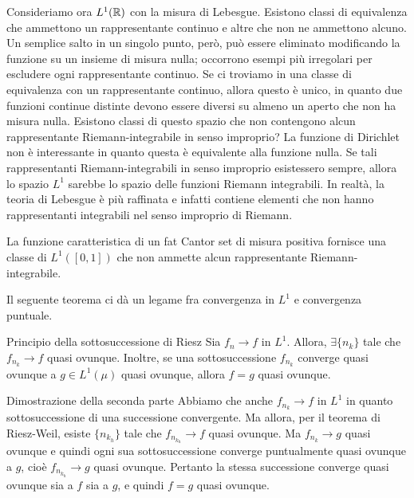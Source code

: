 \documentclass[a4paper]{article}
\begin{document}
\begin{radioactive}
Consideriamo ora \(L^1(\mathbb{R})\) con la misura di Lebesgue.
Esistono classi di equivalenza che ammettono un rappresentante continuo e altre che non ne ammettono alcuno. Un semplice salto in un singolo punto, però, può essere eliminato modificando la funzione su un insieme di misura nulla; occorrono esempi più irregolari per escludere ogni rappresentante continuo.
Se ci troviamo in una classe di equivalenza
con un rappresentante continuo, allora questo è unico, in quanto
due funzioni continue distinte devono essere diversi su almeno un aperto che non ha misura nulla.
Esistono classi di questo spazio che non contengono alcun rappresentante
Riemann-integrabile in senso improprio?
La funzione di Dirichlet non è interessante in quanto
questa è equivalente alla funzione nulla. Se tali rappresentanti Riemann-integrabili
in senso improprio esistessero sempre, allora lo spazio \(L^1\)
sarebbe lo spazio delle funzioni Riemann integrabili.
In realtà, la teoria di Lebesgue è più raffinata e infatti contiene
elementi che non hanno rappresentanti integrabili nel senso improprio di Riemann.
\end{radioactive}

\begin{radioactive}
\begin{snippetexample}{}
    La funzione caratteristica di un fat Cantor set di misura positiva
    fornisce una classe di \(L^1([0,1])\) che non ammette alcun
    rappresentante Riemann-integrabile.
\end{snippetexample}
\end{radioactive}

\begin{radioactive}
Il seguente teorema ci dà un legame fra convergenza in \(L^1\)
e convergenza puntuale.
\end{radioactive}

\begin{radioactive}
\begin{snippettheorem}{Principio della sottosuccessione di Riesz}
    Sia \(f_n \to f\) in \(L^1\). Allora, \(\exists \{n_k\}\)
    tale che \(f_{n_k} \to f\) quasi ovunque.
    Inoltre, se una sottosuccessione \(f_{n_k}\) converge quasi ovunque a \(g\in L^1(\mu)\)
    quasi ovunque, allora \(f = g\) quasi ovunque.
\end{snippettheorem}
\end{radioactive}

\begin{radioactive}
\begin{snippetproof}{Dimostrazione della seconda parte}
    Abbiamo che anche \(f_{n_k} \to f\) in \(L^1\)
    in quanto sottosuccessione di una successione convergente.
    Ma allora, per il teorema di Riesz-Weil, esiste \(\{n_{k_h}\}\)
    tale che \(f_{n_{k_h}} \to f\) quasi ovunque.
    Ma \(f_{n_k} \to g\) quasi ovunque e quindi ogni sua sottosuccessione
    converge puntualmente quasi ovunque a \(g\),
    cioè \(f_{n_{k_h}} \to g\) quasi ovunque. Pertanto la stessa successione converge quasi ovunque sia a \(f\) sia a \(g\), e quindi \(f=g\) quasi ovunque.
\end{snippetproof}
\end{radioactive}
\end{document}
